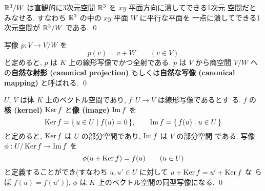 \documentclass[12pt,twoside]{jarticle}
\begin{document}
\begin{rem}
  ${\mathbb R}^3/W$ は直観的に3次元空間 ${\mathbb R}^3$ を $xy$ 平面方向に潰してできる1次元
  空間だとみなせる. すなわち ${\mathbb R}^3$ の中の $xy$ 平面 $W$ に平行な平面を
  一点に潰してできる1次元空間が ${\mathbb R}^3/W$ である.
  \qed
\end{rem}


\begin{question}[自然な射影]
  写像 $p:V\to V/W$ を
  \begin{equation*}
    p(v) = v+W \qquad (v\in V)
  \end{equation*}
  と定めると, $p$ は $K$ 上の線形写像でかつ全射である.
  $p$ は $V$ から商空間 $V/W$ への{\bf 自然な射影 (canonical projection)} 
  もしくは{\bf 自然な写像 (canonical mapping)} と呼ばれる.
  \qed
\end{question}


\begin{question}[準同型定理]
  $U$, $V$ は体 $K$ 上のベクトル空間であり, $f:U\to V$ は線形写像であるとす
  る.  $f$ の{\bf 核 (kernel)} $\mathop{\mathrm{Ker}}\nolimits f$ と{\bf 像 (image)} $\mathop{\mathrm{Im}}\nolimits f$ を
  \begin{equation*}
    \mathop{\mathrm{Ker}}\nolimits f = \{\, u\in U\mid f(u) = 0 \,\},
    \qquad
    \mathop{\mathrm{Im}}\nolimits f = \{\, f(u) \mid u\in U \,\}
  \end{equation*}
  と定めると, $\mathop{\mathrm{Ker}}\nolimits f$ は $U$ の部分空間であり, $\mathop{\mathrm{Im}}\nolimits f$ は $V$ の部分空間
  である.  写像 $\phi:U/\mathop{\mathrm{Ker}}\nolimits f\to \mathop{\mathrm{Im}}\nolimits f$ を
  \begin{equation*}
    \phi(u+\mathop{\mathrm{Ker}}\nolimits f) = f(u) \qquad (u\in U)
  \end{equation*}
  と定義することができ(すなわち $u,u'\in U$ に対して $u+\mathop{\mathrm{Ker}}\nolimits f=u'+\mathop{\mathrm{Ker}}\nolimits f$ な
  らば $f(u)=f(u')$), $\phi$ は $K$ 上のベクトル空間の同型写像になる. 
  \qed
\end{question}

\end{document}
